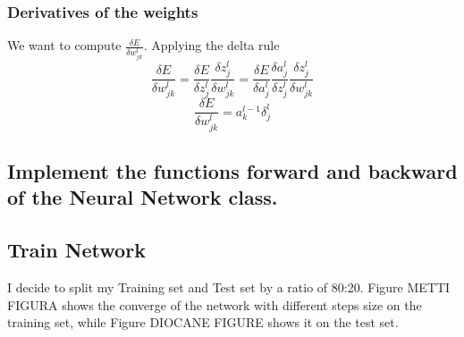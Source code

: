 \documentclass[11pt]{article}
\begin{document}
\subsubsection{Derivatives of the weights}
We want to compute $\frac{\delta E}{\delta w^l_{jk}}$. Applying the delta rule
\begin{equation}
\frac{\delta E}{\delta w^l_{jk}} = \frac{\delta E}{\delta z^l_j}\frac{\delta z^l_j}{\delta w^l_{jk}} =	
\frac{\delta E}{\delta a^l_j}\frac{\delta a^l_j}{\delta z^l_{j}}
\frac{\delta z^l_j}{\delta w^l_{jk}}
\end{equation}
\begin{equation}
\label{eq:derivativesWeigthDeltas}	
\frac{\delta E}{\delta w^l_{jk}} = a^{l-1}_k \delta^l_j
\end{equation}
\subsection{Implement the functions forward and backward of the Neural Network class.}
\subsection{Train Network}
I decide to split my Training set and Test set by a ratio of 80:20. Figure METTI FIGURA shows the converge of the network with different steps size on the training set, while Figure DIOCANE FIGURE shows it on the test set.
\end{document}
